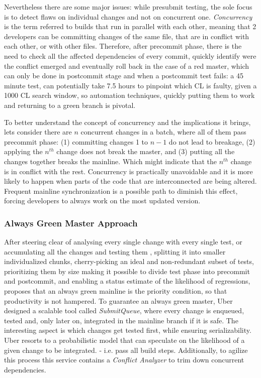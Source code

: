 Nevertheless there are some major issues: while presubmit testing, the sole focus is to detect flaws on individual changes and not on concurrent one. \textit{Concurrency} is the term referred to builds that run in parallel with each other, meaning that 2 developers can be committing changes of the same file, that are in conflict with each other, or with other files. Therefore, after precommit phase, there is the need to check all the affected dependencies of every commit, quickly identify were the conflict emerged and eventually roll back in the case of a red master, which can only be done in postcommit stage \cite{Uber} and when a postcommit test fails: a 45 minute test, can potentially take 7.5 hours to pinpoint which CL is faulty, given a 1000 CL search window, so automation techniques, quickly putting them to work and returning to a green branch is pivotal. \cite{Ziftci}
\par To better understand the concept of concurrency and the implications it brings, lets consider there are $n$ concurrent changes in a batch, where all of them pass precommit phase: (1) committing changes 1 to $n-1$ do not lead to breakage, (2) applying the $n^{th}$ change does not break the master, and (3) putting all the changes together breaks the mainline. Which might indicate that  the $n^{th}$ change is in conflict with the rest. Concurrency is practically unavoidable and it is more likely to happen when parts of the code that are interconnected are being altered. Frequent mainline synchronization is a possible path to diminish this effect, forcing developers to always work on the most updated version.\cite{Uber} 


\subsubsection{Always Green Master Approach}

After steering clear of analysing every single change with every single test, or accumulating all the changes and testing them , splitting it into smaller individualized chunks, cherry-picking an ideal and non-redundant subset of tests, prioritizing them by size making it possible to divide test phase into precommit and postcommit, and enabling a status estimate of the likelihood of regressions,   \cite{Uber} proposes that an always green mainline is the priority condition, so that productivity is not hampered. To guarantee an always green master, Uber designed a scalable tool called \textit{SubmitQueue}, where every change is enqueued, tested and, only later on, integrated in the mainline branch if it is safe. The interesting aspect is which changes get tested first, while ensuring serializability. Uber resorts to a probabilistic model that can speculate on the likelihood of a given change to be integrated. - i.e. pass all build steps. Additionally, to agilize this process this service contains a \textit{Conflict Analyzer} to trim down concurrent dependencies. 

